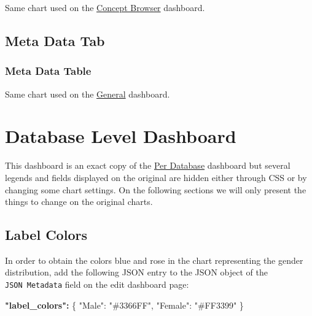 \documentclass[
]{book}
\newenvironment{Shaded}{\begin{snugshade}}{\end{snugshade}}
\newcommand{\DataTypeTok}[1]{\textcolor[rgb]{0.13,0.29,0.53}{#1}}
\newcommand{\ErrorTok}[1]{\textcolor[rgb]{0.64,0.00,0.00}{\textbf{#1}}}
\newcommand{\FunctionTok}[1]{\textcolor[rgb]{0.00,0.00,0.00}{#1}}
\newcommand{\StringTok}[1]{\textcolor[rgb]{0.31,0.60,0.02}{#1}}
\begin{document}
Same chart used on the \protect\hyperlink{conceptBrowserTable}{Concept Browser} dashboard.

\hypertarget{meta-data-tab}{%
\subsection*{Meta Data Tab}\label{meta-data-tab}}

\hypertarget{meta-data-table}{%
\subsubsection*{Meta Data Table}\label{meta-data-table}}

Same chart used on the \protect\hyperlink{metaDataTable}{General} dashboard.

\hypertarget{database-level-dashboard}{%
\section{Database Level Dashboard}\label{database-level-dashboard}}

This dashboard is an exact copy of the \protect\hyperlink{PerDatabaseDashboard}{Per Database} dashboard but several legends and fields
displayed on the original are hidden either through CSS or by changing some chart settings.
On the following sections we will only present the things to change on the original charts.

\hypertarget{label-colors-2}{%
\subsection*{Label Colors}\label{label-colors-2}}

In order to obtain the colors blue and rose in the chart representing the gender distribution,
add the following JSON entry to the JSON object of the \texttt{JSON\ Metadata} field on the edit dashboard page:

\begin{Shaded}
\begin{Highlighting}[]
\ErrorTok{"label\_colors":} \FunctionTok{\{}
    \DataTypeTok{"Male"}\FunctionTok{:} \StringTok{"\#3366FF"}\FunctionTok{,}
    \DataTypeTok{"Female"}\FunctionTok{:} \StringTok{"\#FF3399"}
\FunctionTok{\}}
\end{Highlighting}
\end{Shaded}
\end{document}
